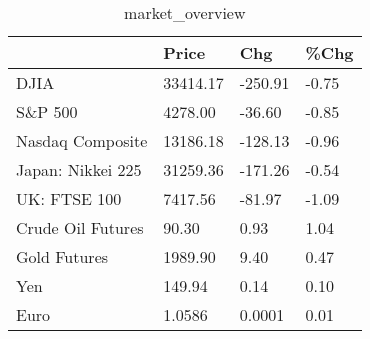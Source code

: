 \documentclass{article}%
\begin{document}
%


\begin{table}[htbp]%
\caption{market\_overview}%
\centering%
\begin{adjustbox}{width=1\textwidth}%
\begin{tabular}{llll}
\toprule
                  &    Price &     Chg &  \%Chg \\
\midrule
             DJIA & 33414.17 & -250.91 & -0.75 \\
          S\&P 500 &  4278.00 &  -36.60 & -0.85 \\
 Nasdaq Composite & 13186.18 & -128.13 & -0.96 \\
Japan: Nikkei 225 & 31259.36 & -171.26 & -0.54 \\
     UK: FTSE 100 &  7417.56 &  -81.97 & -1.09 \\
Crude Oil Futures &    90.30 &    0.93 &  1.04 \\
     Gold Futures &  1989.90 &    9.40 &  0.47 \\
              Yen &   149.94 &    0.14 &  0.10 \\
             Euro &   1.0586 &  0.0001 &  0.01 \\
\bottomrule
\end{tabular}
%
\end{adjustbox}%
\end{table}

%
\end{document}

